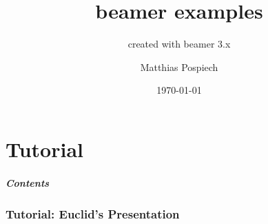 \documentclass{beamer}
\title{beamer examples}
\subtitle{created with beamer 3.x}
\author{Matthias Pospiech}
\institute{University of Hannover}
\date{\today}
\begin{document}
\begin{frame}[plain]
  \titlepage
\end{frame}
\part{Tutorial}
\frame{\partpage}
\begin{frame}
  \frametitle{Contents}
  \tableofcontents[%
  pausesections, %
  ]
\end{frame}
\section{Tutorial: Euclid's Presentation}
\end{document}
